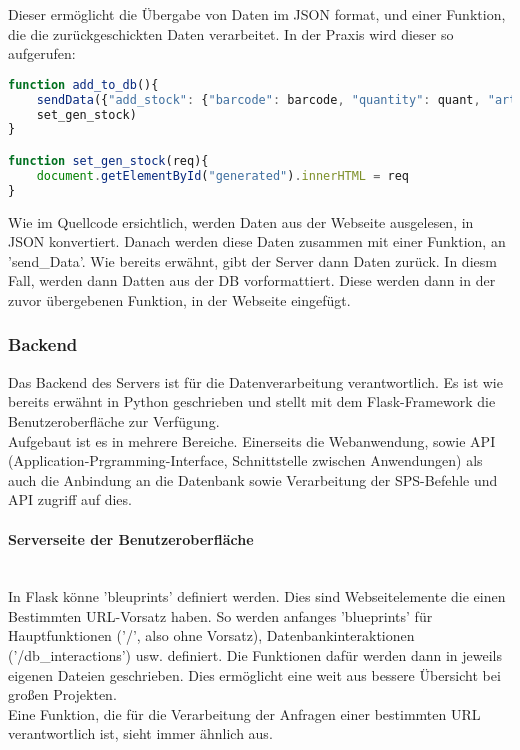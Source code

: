 Dieser ermöglicht die Übergabe von Daten im JSON format, und einer Funktion, die die zurückgeschickten Daten verarbeitet. In der Praxis wird dieser so aufgerufen:

\begin{lstlisting}[language=JavaScript]
function add_to_db(){
    sendData({"add_stock": {"barcode": barcode, "quantity": quant, "article": article}}, 
    set_gen_stock)
}

function set_gen_stock(req){
    document.getElementById("generated").innerHTML = req
}\end{lstlisting}

Wie im Quellcode ersichtlich, werden Daten aus der Webseite ausgelesen, in JSON konvertiert. Danach werden diese Daten zusammen mit einer Funktion, an 'send\_Data'. Wie bereits erwähnt, gibt der Server dann Daten zurück. In diesm Fall, werden dann Datten aus der DB vorformattiert. Diese werden dann in der zuvor übergebenen Funktion, in der Webseite eingefügt.

\subsubsection{Backend}
Das Backend des Servers ist für die Datenverarbeitung verantwortlich. Es ist wie bereits erwähnt in Python geschrieben und stellt mit dem Flask-Framework die Benutzeroberfläche zur Verfügung. \\
Aufgebaut ist es in mehrere Bereiche. Einerseits die Webanwendung, sowie API (Application-Prgramming-Interface, Schnittstelle zwischen Anwendungen) als auch die Anbindung an die Datenbank sowie Verarbeitung der SPS-Befehle und API zugriff auf dies.

\paragraph{Serverseite der Benutzeroberfläche}\mbox{}\\
In Flask könne 'bleuprints' definiert werden. Dies sind Webseitelemente die einen Bestimmten URL-Vorsatz haben. So werden anfanges 'blueprints' für Hauptfunktionen ('/', also ohne Vorsatz), Datenbankinteraktionen ('/db\_interactions') usw. definiert. Die Funktionen dafür werden dann in jeweils eigenen Dateien geschrieben. Dies ermöglicht eine weit aus bessere Übersicht bei großen Projekten. \\
Eine Funktion, die für die Verarbeitung der Anfragen einer bestimmten URL verantwortlich ist, sieht immer ähnlich aus.

